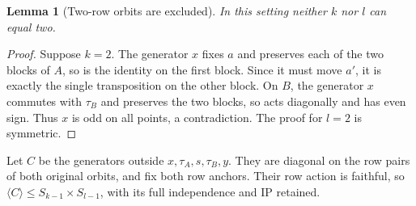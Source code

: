 \documentclass[11pt,a4paper]{article}
\newtheorem{lemma}{Lemma}
\newcommand{\gen}[1]{\langle#1\rangle}
\begin{document}
\begin{lemma}[Two-row orbits are excluded]
In this setting neither $k$ nor $l$ can equal two.
\end{lemma}
\begin{proof}
Suppose $k=2$. The generator $x$ fixes $a$ and preserves
each of the two blocks of $A$, so is the identity on the
first block. Since it must move $a'$, it is exactly the
single transposition on the other block. On $B$, the
generator $x$ commutes with $\tau_B$ and preserves the
two blocks, so acts diagonally and has even sign. Thus
$x$ is odd on all points, a contradiction. The proof for
$l=2$ is symmetric.
\end{proof}

Let $C$ be the generators outside $x,\tau_A,s,\tau_B,y$.
They are diagonal on the row pairs of both original orbits,
and fix both row anchors. Their row action is faithful,
so $\gen C\leq S_{k-1}\times S_{l-1}$, with its full
independence and IP retained.
\end{document}
